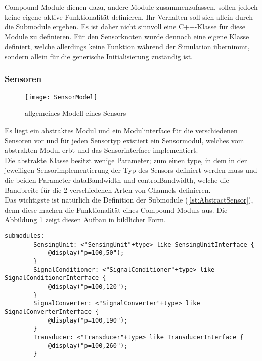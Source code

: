 Compound Module dienen dazu, andere Module zusammenzufassen, sollen jedoch keine eigene aktive Funktionalität definieren. Ihr Verhalten soll sich allein durch die Submodule ergeben. Es ist daher nicht sinnvoll eine C++-Klasse für diese Module zu definieren.\newline
Für den Sensorknoten wurde dennoch eine eigene Klasse definiert, welche allerdings keine Funktion während der Simulation übernimmt, sondern allein für die generische Initialisierung zuständig ist.

\subsubsection{Sensoren}

\begin{figure}[htbp]
\centering
\caption{allgemeines Modell eines Sensors}
\label{fig:SensorModel}
\texttt{[image: SensorModel]}
\end{figure}

Es liegt ein abstraktes Modul und ein Modulinterface für die verschiedenen Sensoren vor und für jeden Sensortyp existiert ein Sensormodul, welches vom abstrakten Modul erbt und das Sensorinterface implementiert.\\
Die abstrakte Klasse besitzt wenige Parameter; zum einen type, in dem in der jeweiligen Sensorimplementierung der Typ des Sensors definiert werden muss und die beiden Parameter dataBandwidth und controlBandwidth, welche die Bandbreite für die 2 verschiedenen Arten von Channels definieren.\\
Das wichtigste ist natürlich die Definition der Submodule (\ref{lst:AbstractSensor}), denn diese machen die Funktionalität eines Compound Moduls aus. Die Abbildung \ref{fig:SensorModel} zeigt diesen Aufbau in bildlicher Form.

\begin{lstlisting}[language=ned,caption={AbstractSensor},label=lst:AbstractSensor]
submodules:
        SensingUnit: <"SensingUnit"+type> like SensingUnitInterface {
            @display("p=100,50");
        }
        SignalConditioner: <"SignalConditioner"+type> like SignalConditionerInterface {
            @display("p=100,120");
        }
        SignalConverter: <"SignalConverter"+type> like SignalConverterInterface {
            @display("p=100,190");
        }
        Transducer: <"Transducer"+type> like TransducerInterface {
            @display("p=100,260");
        }
\end{lstlisting}

